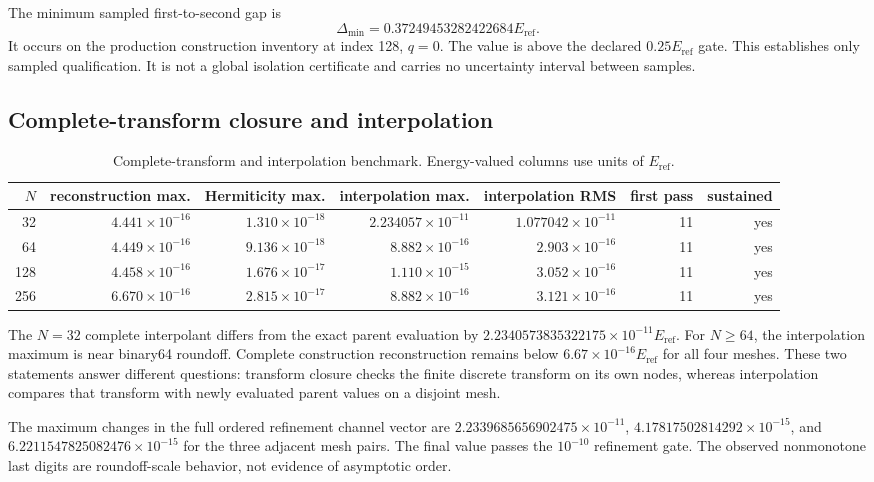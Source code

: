 \documentclass[11pt]{article}
\newcommand{\eref}{E_{\mathrm{ref}}}
\begin{document}
The minimum sampled first-to-second gap is
\begin{equation}
 \Delta_{\min}=0.37249453282422684\eref.
\end{equation}
It occurs on the production construction inventory at index 128, $q=0$.  The value is
above the declared $0.25\eref$ gate.  This establishes only sampled qualification.  It
is not a global isolation certificate and carries no uncertainty interval between
samples.

\subsection{Complete-transform closure and interpolation}

\begin{table}[htbp]
\centering
\caption{Complete-transform and interpolation benchmark.  Energy-valued columns use
units of $\eref$.}
\label{tab:mesh}
\scriptsize
\setlength{\tabcolsep}{3pt}
\begin{tabular}{rrrrrrr}
\toprule
$N$ & reconstruction max. & Hermiticity max. & interpolation max. & interpolation RMS & first pass & sustained \\
\midrule
32  & $4.441\times10^{-16}$ & $1.310\times10^{-18}$ & $2.234057\times10^{-11}$ & $1.077042\times10^{-11}$ & 11 & yes \\
64  & $4.449\times10^{-16}$ & $9.136\times10^{-18}$ & $8.882\times10^{-16}$ & $2.903\times10^{-16}$ & 11 & yes \\
128 & $4.458\times10^{-16}$ & $1.676\times10^{-17}$ & $1.110\times10^{-15}$ & $3.052\times10^{-16}$ & 11 & yes \\
256 & $6.670\times10^{-16}$ & $2.815\times10^{-17}$ & $8.882\times10^{-16}$ & $3.121\times10^{-16}$ & 11 & yes \\
\bottomrule
\end{tabular}
\end{table}

The $N=32$ complete interpolant differs from the exact parent evaluation by
$2.2340573835322175\times10^{-11}\eref$.  For $N\ge64$, the interpolation maximum is
near binary64 roundoff.  Complete construction reconstruction remains below
$6.67\times10^{-16}\eref$ for all four meshes.  These two statements answer different
questions: transform closure checks the finite discrete transform on its own nodes,
whereas interpolation compares that transform with newly evaluated parent values on a
disjoint mesh.

The maximum changes in the full ordered refinement channel vector are
$2.2339685656902475\times10^{-11}$, $4.17817502814292\times10^{-15}$, and
$6.2211547825082476\times10^{-15}$ for the three adjacent mesh pairs.  The final value
passes the $10^{-10}$ refinement gate.  The observed nonmonotone last digits are
roundoff-scale behavior, not evidence of asymptotic order.
\end{document}
